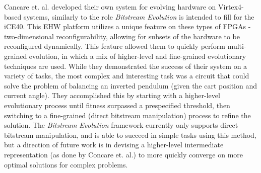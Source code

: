 \documentclass{ieeeaccess}
\begin{document}
{%
Cancare et. al. developed their own system \cite{Cancare2010ASystems} for evolving hardware on Virtex4-based systems, similarly to the role \textit{Bitstream Evolution} is intended to fill for the iCE40. This EHW platform utilizes a unique feature on these types of FPGAs - two-dimensional reconfigurability, allowing for subsets of the hardware to be reconfigured dynamically. This feature allowed them to quickly perform multi-grained evolution, in which a mix of higher-level and fine-grained evolutionary techniques are used. While they demonstrated the success of their system on a variety of tasks, the most complex and interesting task was a circuit that could solve the problem of balancing an inverted pendulum (given the cart position and current angle). They accomplished this by starting with a higher-level evolutionary process until fitness surpassed a prespecified threshold, then switching to a fine-grained (direct bitstream manipulation) process to refine the solution. The \textit{Bitstream Evolution} framework currently only supports direct bitstream manipulation, and is able to succeed in simple tasks using this method, but a direction of future work is in devising a higher-level intermediate representation (as done by Concare et. al.) to more quickly converge on more optimal solutions for complex problems.

}
\end{document}
